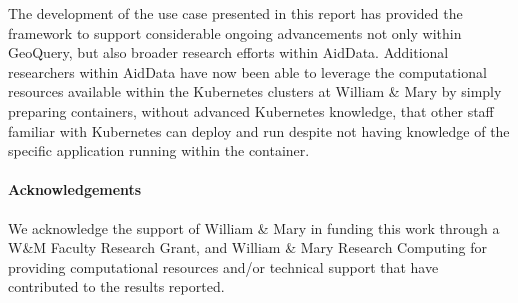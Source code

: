 \documentclass[a4paper]{article}
\begin{document}
The development of the use case presented in this report has provided the framework to support considerable ongoing advancements not only within GeoQuery, but also broader research efforts within AidData. Additional researchers within AidData have now been able to leverage the computational resources available within the Kubernetes clusters at William \& Mary by simply preparing containers, without advanced Kubernetes knowledge, that other staff familiar with Kubernetes can deploy and run despite not having knowledge of the specific application running within the container.





\paragraph{Acknowledgements} 

We acknowledge the support of William \& Mary in funding this work through a W\&M Faculty Research Grant, and William \& Mary Research Computing for providing computational resources and/or technical support that have contributed to the results reported. 




	
\end{document}
